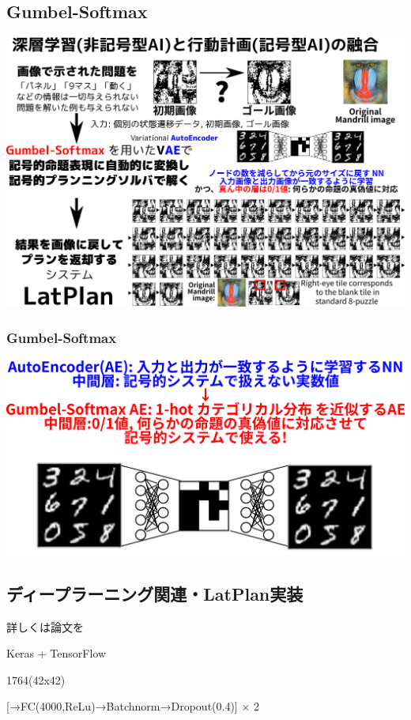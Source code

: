 \subsection{Gumbel-Softmax}
\label{sec:orgheadline57}

\includegraphics{img/keps17.png}

\subsubsection{Gumbel-Softmax}
\label{sec:orgheadline56}

\includegraphics{img/sae/state-ae.png}

\subsection{ディープラーニング関連・LatPlan実装}
\label{sec:orgheadline58}

詳しくは論文を

Keras + TensorFlow

1764(42x42)

[→FC(4000,ReLu)→Batchnorm→Dropout(0.4)] × 2

